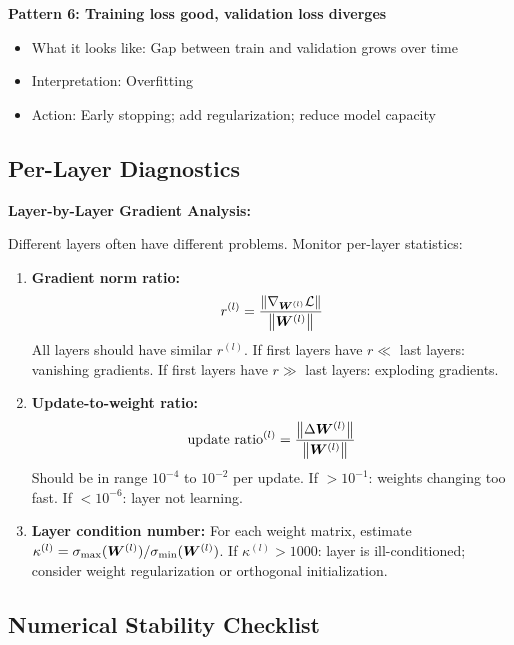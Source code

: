 \documentclass[../../main.tex]{subfiles}
\begin{document}
\begin{important}
\textbf{Pattern 6: Training loss good, validation loss diverges}
\begin{itemize}
    \item What it looks like: Gap between train and validation grows over time
    \item Interpretation: Overfitting
    \item Action: Early stopping; add regularization; reduce model capacity
\end{itemize}
\end{important}

\subsection{Per-Layer Diagnostics}

\begin{keyconcept}
\textbf{Layer-by-Layer Gradient Analysis:}

Different layers often have different problems. Monitor per-layer statistics:

\begin{enumerate}
    \item \textbf{Gradient norm ratio:}
    \[
        r^{(l)} = \frac{\left\lVert \nabla_{\boldsymbol{W}^{(l)}} \mathcal{L} \right\rVert}{\left\lVert \boldsymbol{W}^{(l)} \right\rVert}
    \]
    All layers should have similar $r^{(l)}$. If first layers have $r \ll$ last layers: vanishing gradients. If first layers have $r \gg$ last layers: exploding gradients.

    \item \textbf{Update-to-weight ratio:}
    \[
        \text{update ratio}^{(l)} = \frac{\left\lVert \Delta \boldsymbol{W}^{(l)} \right\rVert}{\left\lVert \boldsymbol{W}^{(l)} \right\rVert}
    \]
    Should be in range $10^{-4}$ to $10^{-2}$ per update. If $>10^{-1}$: weights changing too fast. If $<10^{-6}$: layer not learning.

    \item \textbf{Layer condition number:}
    For each weight matrix, estimate $\kappa^{(l)} = \sigma_{\max}(\boldsymbol{W}^{(l)}) / \sigma_{\min}(\boldsymbol{W}^{(l)})$.
    If $\kappa^{(l)} > 1000$: layer is ill-conditioned; consider weight regularization or orthogonal initialization.
\end{enumerate}
\end{keyconcept}

\subsection{Numerical Stability Checklist}
\end{document}
